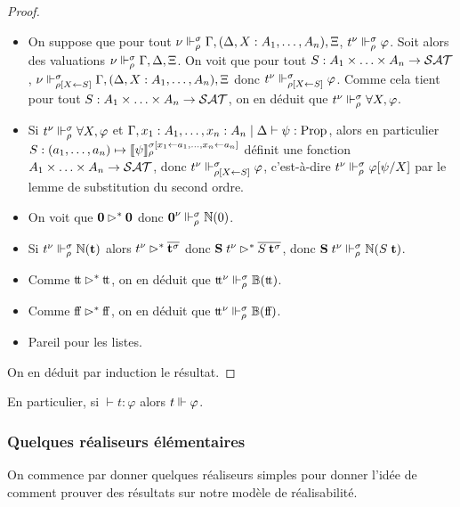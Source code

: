 \documentclass{article}
\begin{document}
\begin{proof}
\begin{itemize}
  \item On suppose que pour tout $\nu\Vdash_\rho^\sigma \Gamma, (\Delta, X : A_1,\ldots,A_n), \Xi$, $t^\nu \Vdash_\rho^\sigma \varphi$. Soit alors des valuations $\nu\Vdash_\rho^\sigma\Gamma, \Delta,\Xi$. On voit que pour tout $S : A_1\times\ldots\times A_n \to \mathcal {SAT}$, $\nu\Vdash_{\rho[X\leftarrow S]}^\sigma \Gamma, (\Delta, X : A_1,\ldots,A_n),\Xi$ donc $t^\nu\Vdash_{\rho[X\leftarrow S]}^\sigma \varphi$. Comme cela tient pour tout $S : A_1\times\ldots\times A_n \to \mathcal {SAT}$, on en déduit que $t^\nu\Vdash_\rho^\sigma \forall X, \varphi$.
  \item Si $t^\nu\Vdash_\rho^\sigma \forall X, \varphi$ et $\Gamma,x_1 : A_1,\ldots,x_n : A_n\mid\Delta\vdash \psi : \mathrm{Prop}$, alors en particulier $S : (a_1,\ldots,a_n) \mapsto \llbracket \psi \rrbracket_\rho^{\sigma[x_1\leftarrow a_1,\ldots, x_n \leftarrow a_n]}$ définit une fonction $A_1\times\ldots\times A_n \to\mathcal {SAT}$, donc $t^\nu\Vdash_{\rho[X\leftarrow S]}^\sigma \varphi$, c'est-à-dire $t^\nu\Vdash_\rho^\sigma \varphi[\psi/X]$ par le lemme de substitution du second ordre.
  \item On voit que $\boldsymbol 0\rhd^*\boldsymbol 0$ donc $\boldsymbol 0^\nu\Vdash_\rho^\sigma\mathbb{N}(0)$.
  \item Si $t^\nu\Vdash_\rho^\sigma \mathbb{N}(\mathbf{t})$ alors $t^\nu\rhd^*\overline{\mathbf{t}^\sigma}$ donc $\mathbf{S}\;t^\nu\rhd^* \overline{S\:\mathbf{t}^\sigma}$, donc $\mathbf{S}\;t^\nu\Vdash_\rho^\sigma \mathbb{N}(S\;\mathbf{t})$.
  \item Comme $\mathrm{t}\!\mathrm{t}\rhd^* \mathrm{t}\!\mathrm{t}$, on en déduit que $\mathrm{t}\!\mathrm{t}^\nu\Vdash_\rho^\sigma\mathbb{B}(\mathrm{t}\!\mathrm{t})$.
  \item Comme $\mathrm{f}\!\mathrm{f}\rhd^* \mathrm{f}\!\mathrm{f}$, on en déduit que $\mathrm{t}\!\mathrm{t}^\nu\Vdash_\rho^\sigma\mathbb{B}(\mathrm{f}\!\mathrm{f})$.
  \item Pareil pour les listes.
  \end{itemize}

  On en déduit par induction le résultat.
\end{proof}

En particulier, si $\vdash t : \varphi$ alors $t\Vdash \varphi$.

\subsubsection{Quelques réaliseurs élémentaires}

On commence par donner quelques réaliseurs simples pour donner l'idée de comment prouver des résultats sur notre modèle de réalisabilité.
\end{document}
